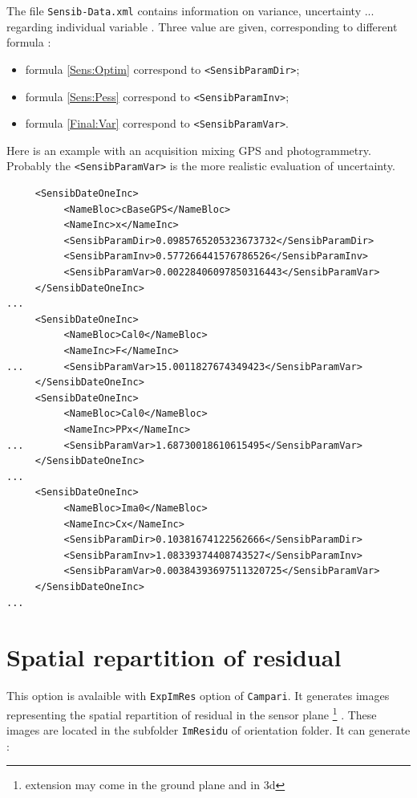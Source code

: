 The file {\tt Sensib-Data.xml} contains information on  variance, uncertainty  ...
regarding individual variable . Three value are given, corresponding
to different formula  :

\begin{itemize}
    \item formula \ref{Sens:Optim}  correspond to {\tt <SensibParamDir>};
    \item formula \ref{Sens:Pess}   correspond to {\tt <SensibParamInv>};
    \item formula \ref{Final:Var}   correspond to {\tt <SensibParamVar>}.
\end{itemize}

Here is an example with an acquisition mixing GPS and photogrammetry. Probably the
 {\tt <SensibParamVar>} is the more realistic evaluation of uncertainty.

\begin{verbatim}
     <SensibDateOneInc>
          <NameBloc>cBaseGPS</NameBloc>
          <NameInc>x</NameInc>
          <SensibParamDir>0.0985765205323673732</SensibParamDir>
          <SensibParamInv>0.577266441576786526</SensibParamInv>
          <SensibParamVar>0.00228406097850316443</SensibParamVar>
     </SensibDateOneInc>
...
     <SensibDateOneInc>
          <NameBloc>Cal0</NameBloc>
          <NameInc>F</NameInc>
...       <SensibParamVar>15.0011827674349423</SensibParamVar>
     </SensibDateOneInc>
     <SensibDateOneInc>
          <NameBloc>Cal0</NameBloc>
          <NameInc>PPx</NameInc>
...       <SensibParamVar>1.68730018610615495</SensibParamVar>
     </SensibDateOneInc>
...
     <SensibDateOneInc>
          <NameBloc>Ima0</NameBloc>
          <NameInc>Cx</NameInc>
          <SensibParamDir>0.10381674122562666</SensibParamDir>
          <SensibParamInv>1.08339374408743527</SensibParamInv>
          <SensibParamVar>0.00384393697511320725</SensibParamVar>
     </SensibDateOneInc>
...
\end{verbatim}


\section{Spatial repartition of residual}

This option is avalaible with {\tt ExpImRes} option of {\tt Campari}.
It generates images representing the spatial repartition of residual
in the sensor plane \footnote{extension may come in the ground plane and in $3$d} . 
These images are located in the subfolder
{\tt ImResidu} of orientation folder. It can generate :


